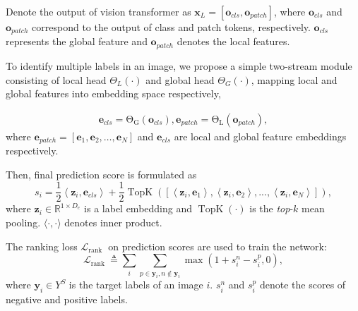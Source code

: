 \documentclass[letterpaper]{article} %
\begin{document}
Denote the output of vision transformer as $\mathbf{x}_{L}= \left[\mathbf{o}_{cls}, \mathbf{o}_{patch}\right]$, where $\mathbf{o}_{cls}$ and $\mathbf{o}_{patch}$ correspond to the output of class and patch tokens, respectively.
$\mathbf{o}_{cls}$ represents the global feature and $\mathbf{o}_{patch}$ denotes the local features.
\par
To identify multiple labels in an image, we propose a simple two-stream module consisting of local head $\Theta_{L}\left(\cdot\right)$ and global head $\Theta_{G}\left(\cdot\right)$, mapping local and global features into embedding space respectively, \par
\begin{equation}
\begin{aligned}
\mathbf{e}_{cls}=\operatorname{\Theta_{G}}\left(\mathbf{o}_{cls}\right), \mathbf{e}_{patch}=\operatorname{\Theta_{L}}\left(\mathbf{o}_{patch}\right),
\end{aligned}
\end{equation}
where $\mathbf{e}_{patch}= [\mathbf{e}_{1}, \mathbf{e}_{2}, \dots, \mathbf{e}_{N}]$ and $\mathbf{e}_{cls}$ are local and global feature embeddings respectively. \par
Then, final prediction score is formulated as
\begin{equation}
s_{i}=\frac{1}{2}\left\langle\mathbf{z}_{i}, \mathbf{e}_{cls}\right\rangle + \frac{1}{2}\operatorname{TopK}\left(\left[\left\langle\mathbf{z}_{i}, \mathbf{e}_{1}\right\rangle,
\left\langle\mathbf{z}_{i}, \mathbf{e}_{2}\right\rangle,
...,
\left\langle\mathbf{z}_{i}, \mathbf{e}_{N}\right\rangle
\right]\right),
\label{eq:logit}
\end{equation}
where $\mathbf{z}_{i} \in \mathbb{R}^{1 \times D_{e}}$ is a label embedding and $\operatorname{TopK} \left(\cdot\right)$ is the \textit{top}-$k$ mean pooling. $\langle\cdot, \cdot\rangle$ denotes inner product. \par
The ranking loss $\mathcal{L}_{\text {rank }}$ on prediction scores are used to train the network:
\begin{equation}
\mathcal{L}_{\text {rank }} \triangleq \sum_{i} \sum_{p \in \mathbf{y}_{i} , n \notin \mathbf{y}_{i}} \max \left(1+s_{i}^{n}-s_{i}^{p}, 0\right),
\end{equation}
where $\mathbf{y}_{i} \in Y^{S}$ is the target labels of an image $i$. $s_{i}^{n}$ and $s_{i}^{p}$ denote the scores of negative and positive labels.
\end{document}
